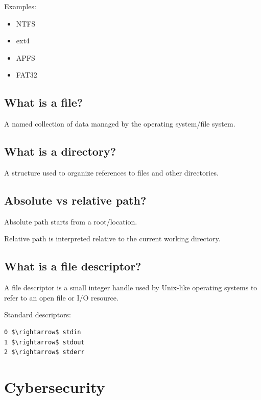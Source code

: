 Examples:

\begin{itemize}
  \item NTFS
  \item ext4
  \item APFS
  \item FAT32
\end{itemize}

\medskip

\subsection{What is a file?}

A named collection of data managed by the operating system/file system.

\medskip

\subsection{What is a directory?}

A structure used to organize references to files and other directories.

\medskip

\subsection{Absolute vs relative path?}

Absolute path starts from a root/location.

Relative path is interpreted relative to the current working directory.

\medskip

\subsection{What is a file descriptor?}

A file descriptor is a small integer handle used by Unix-like operating systems to refer to an open file or I/O resource.

Standard descriptors:

\begin{lstlisting}
0 $\rightarrow$ stdin
1 $\rightarrow$ stdout
2 $\rightarrow$ stderr
\end{lstlisting}

\medskip

\section{Cybersecurity}

